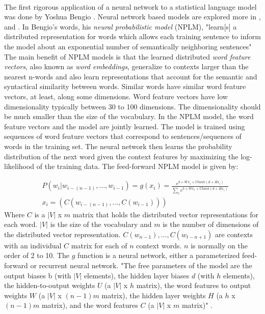 \paragraph{}
The first rigorous application of a neural network to a statistical language model was done by Yoshua Bengio \cite{Bengio2003}. Neural network based models are explored more in \cite{Collobert2008}, and \cite{HuangEtAl2012} . In Bengio's words, his \emph{neural probabilistic model} (NPLM), "learn[s] a distributed representation for words which allows each training sentence to inform the model about an exponential number of semantically neighboring sentences" \cite[pg. 1137]{Bengio2003} The main benefit of NPLM models is that the learned distributed \emph{word feature vectors}, also known as \emph{word embeddings}, generalize to contexts larger than the nearest n-words and also learn representations that account for the semantic and syntactical similarity between words. Similar words have similar word feature vectors, at least, along some dimensions. Word feature vectors have low dimensionality typically between 30 to 100 dimensions. The dimensionality should be much smaller than the size of the vocabulary. In the NPLM model, the word feature vectors and the model are jointly learned. The model is trained using sequences of word feature vectors that correspond to sentences/sequences of words in the training set. The neural network then learns the probability distribution of the next word given the context features by maximizing the log-likelihood of the training data. 
The feed-forward NPLM model is given by:

\begin{align}
&P(w_i | w_{i-(n-1)},\dots, w_{i-1}) = g(x_i) = \frac {e^{b+Wx_i+Utanh(d+Hx_i)}} {\sum_i e^{b+Wx_i+Utanh(d+Hx_i)}} \label{FFNN}
\\
&x_i=\left(C(w_{i-(n-1)}, \dots, C(w_{i-1}) )\right) \nonumber
\end{align}
Where $C$ is a $|V|$ x $m$ matrix that holds the distributed vector representations for each word.  $|V|$ is the size of the vocabulary and $m$ is the number of dimensions of the distributed vector representation. $C(w_{n-1}), \dots, C(w_{t-n+1})$ are contexts with an individual $C$ matrix for each of $n$ context words. $n$ is normally on the order of 2 to 10. The $g$ function is a neural network, either a parameterized feed-forward or recurrent neural network. 
"The free parameters of the model are the output biases b (with $|V|$ elements), the hidden layer biases $d$ (with $h$ elements), the hidden-to-output weights $U$ (a $|V|$ x $h$ matrix), the word features to output weights $W$ (a $|V|$ x $(n-1)m$ matrix), the hidden layer weights $H$ (a $h$ x $(n-1)m$ matrix), and the word features $C$ (a $|V|$ x $m$ matrix)" \cite[pg. 1143]{Bengio2003}.
